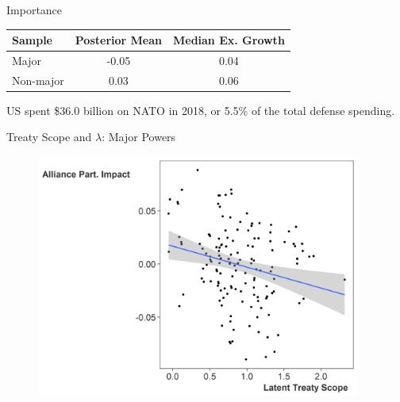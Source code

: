 \documentclass{beamer}
\begin{document}

\begin{frame}[standout]{Importance} 

\begin{tabular}{lcc}
Sample & Posterior Mean & Median Ex. Growth \\
\hline
Major & -0.05 & 0.04 \\
\pause
Non-major & 0.03 & 0.06  \\
\end{tabular}

\pause

US spent \$36.0 billion on NATO in 2018, or 5.5\% of the total defense spending. 


\end{frame}



\begin{frame}{Treaty Scope and $\lambda$: Major Powers}

\begin{figure}[htbp]
	\centering
		\includegraphics[width=0.95\textwidth]{ls-lambda-maj.png}
	\label{fig:ls-lambda-maj}
\end{figure}


\end{frame}


\end{document}
